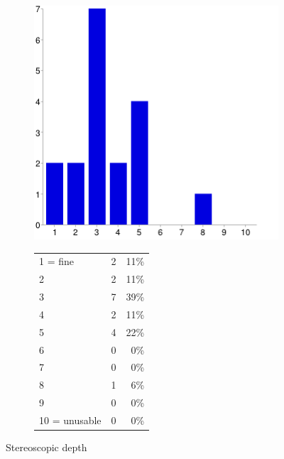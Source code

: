 \documentclass[MSc,paper=a4,pagesize=auto]{icldt}
\begin{document}
\begin{figure}[htbp!]
\centering
\begin{subfigure}{0.4\textwidth}
    \centering
    \includegraphics[width=1\linewidth]{resources/13-stereoscopic_depth}
\end{subfigure}%
\centering
\begin{subfigure}{\textwidth}
    \centering
   	\begin{tabular}{ l c r }
1 = fine&2&11\% \\
2&2&11\% \\
3&7&39\% \\
4&2&11\% \\
5&4&22\% \\
6&0&0\% \\
7&0&0\% \\
8&1&6\% \\
9&0&0\% \\
10 = unusable&0&0\% \\
\end{tabular}
\end{subfigure} 
    \caption{Stereoscopic depth}
    \label{fig:13-stereoscopic_depth}
\end{figure}
\end{document}
